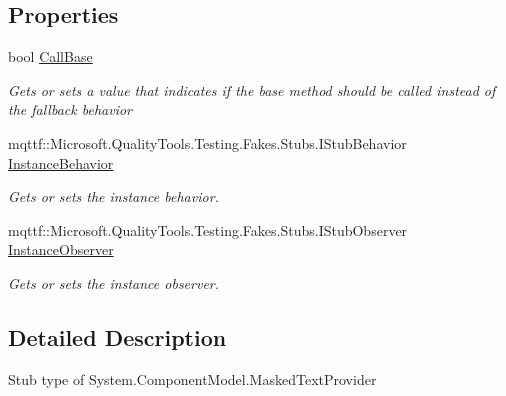 \subsection*{Properties}
\begin{DoxyCompactItemize}
\item 
bool \hyperlink{class_system_1_1_component_model_1_1_fakes_1_1_stub_masked_text_provider_a7ee9ff16f4eebea5db113871acd04b1b}{Call\-Base}
\begin{DoxyCompactList}\small\item\em Gets or sets a value that indicates if the base method should be called instead of the fallback behavior\end{DoxyCompactList}\item 
mqttf\-::\-Microsoft.\-Quality\-Tools.\-Testing.\-Fakes.\-Stubs.\-I\-Stub\-Behavior \hyperlink{class_system_1_1_component_model_1_1_fakes_1_1_stub_masked_text_provider_a3f45b3f7894e1913e30a552d1ddeb959}{Instance\-Behavior}
\begin{DoxyCompactList}\small\item\em Gets or sets the instance behavior.\end{DoxyCompactList}\item 
mqttf\-::\-Microsoft.\-Quality\-Tools.\-Testing.\-Fakes.\-Stubs.\-I\-Stub\-Observer \hyperlink{class_system_1_1_component_model_1_1_fakes_1_1_stub_masked_text_provider_a1abac6ad92dde6986836c6547de92f51}{Instance\-Observer}
\begin{DoxyCompactList}\small\item\em Gets or sets the instance observer.\end{DoxyCompactList}\end{DoxyCompactItemize}


\subsection{Detailed Description}
Stub type of System.\-Component\-Model.\-Masked\-Text\-Provider



